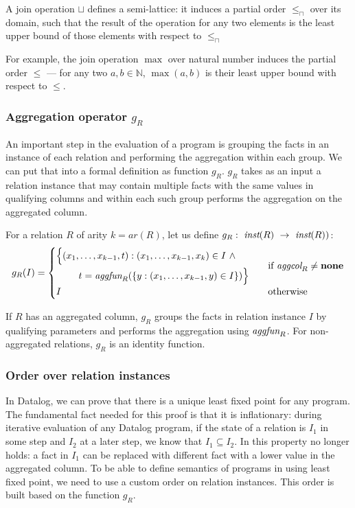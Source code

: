 A join operation $\sqcup$ defines a semi-lattice: it induces a partial order $\le_\sqcap$ over its domain, such that the result of the operation for any two elements is the least upper bound of those elements with respect to $\le_\sqcap$

For example, the join operation $\max$ over natural number induces the partial order $\le$ --- for any two $a, b \in \mathbb{N}$, $\max(a, b)$ is their least upper bound with respect to $\le$.

\subsubsection{Aggregation operator $g_R$}
An important step in the evaluation of a \datalogra program is grouping the facts in an instance of each relation and performing the aggregation within each group. We can put that into a formal definition as function $g_R$. $g_R$ takes as an input a relation instance that may contain multiple facts with the same values in  qualifying columns and within each such group performs the aggregation on the aggregated column.
\begin{defn}\label{d:aggregationoperationgr}
For a relation $R$ of arity $k = ar(R)$, let us define $g_R:~\textit{inst}(R)~\to~\textit{inst}(R))$:
$$
g_R(I) = \begin{cases}
\!\begin{aligned}%
       \Big\{(x_1, &\dots, x_{k-1}, t): (x_1, \dots, x_{k-1}, x_k) \in I~\wedge & \\
           &t = \aggfun_R(\{y: (x_1, \dots, x_{k-1}, y) \in I\})\Big\}&
    \end{aligned}          & \text{if } \aggcol_R \ne \bf{none} \\
I                          & \text{otherwise}
\end{cases}
$$
\end{defn}

If $R$ has an aggregated column, $g_R$ groups the facts in relation instance $I$ by qualifying parameters and performs the aggregation using $\textit{aggfun}_R$. For non-aggregated relations, $g_R$ is an identity function.

\subsubsection{Order over relation instances}
In Datalog, we can prove that there is a unique least fixed point for any program. The fundamental fact needed for this proof is that it is inflationary: during iterative evaluation of any Datalog program, if the state of a relation is $I_1$ in some step and $I_2$ at a later step, we know that $I_1 \subseteq I_2$. In \datalogra this property no longer holds: a fact in $I_1$ can be replaced with different fact with a lower value in the aggregated column. To be able to define semantics of programs in \datalogra using least fixed point, we need to use a custom order on relation instances. This order is built based on the function $g_R$.

